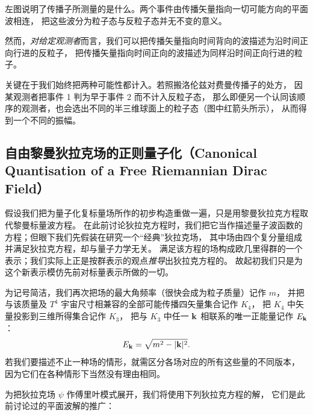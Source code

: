 
左图说明了传播子所测量的是什么。两个事件由传播矢量指向一切可能方向的平面波相连，
把这些波分为粒子态与反粒子态并无不变的意义。

然而，\emph{对给定观测者}而言，我们可以把传播矢量指向时间背向的波描述为沿时间正向行进的反粒子，
把传播矢量指向时间正向的波描述为同样沿时间正向行进的粒子。

关键在于我们始终把两种可能性都计入。若照搬洛伦兹对费曼传播子的处方，
因某观测者把事件 1 判为早于事件 2 而不计入反粒子态，
那么即便另一个认同该顺序的观测者，也会选出不同的半三维球面上的粒子态（图中红箭头所示），
从而得到一个不同的振幅。

\subsection{自由黎曼狄拉克场的正则量子化（Canonical Quantisation of a Free Riemannian Dirac Field）}

假设我们把为量子化复标量场所作的初步构造重做一遍，只是用黎曼狄拉克方程取代黎曼标量波方程。
在此前讨论狄拉克方程时，我们把它当作描述量子波函数的方程；但眼下我们先假装在研究一个“经典”狄拉克场，
其中场由四个复分量组成并满足狄拉克方程，却与量子力学无关。
满足该方程的场构成欧几里得群的一个表示；我们实际上正是按群表示的观点\emph{推导}出狄拉克方程的。
故起初我们只是为这个新表示模仿先前对标量表示所做的一切。

为记号简洁，我们再次把场的最大角频率（很快会成为粒子质量）记作 $m$，
并把与该质量及 $T^{4}$ 宇宙尺寸相兼容的全部可能传播四矢量集合记作 $K_{4}$，
把 $K_{4}$ 中矢量投影到三维所得集合记作 $K_{3}$，
把与 $K_{3}$ 中任一 $\mathbf{k}$ 相联系的唯一正能量记作 $E_{\mathbf{k}}$：
\begin{equation*}
E_{\mathbf{k}}=\sqrt{m^{2}-|\mathbf{k}|^{2}} .
\end{equation*}
若我们要描述不止一种场的情形，就需区分各场对应的所有这些量的不同版本，
因为它们在各种情形下当然没有理由相同。

为把狄拉克场 $\psi$ 作傅里叶模式展开，我们将使用下列狄拉克方程的解，
它们是此前讨论过的平面波解的推广：

